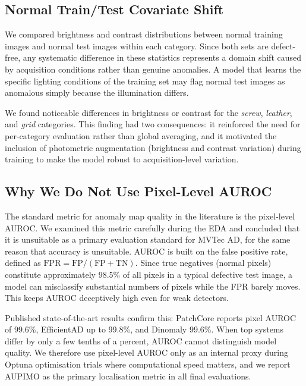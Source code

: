 \documentclass[11pt, a4paper]{article}
\begin{document}
\subsection{Normal Train/Test Covariate Shift}

We compared brightness and contrast distributions between normal training images and normal test images within each category. Since both sets are defect-free, any systematic difference in these statistics represents a domain shift caused by acquisition conditions rather than genuine anomalies. A model that learns the specific lighting conditions of the training set may flag normal test images as anomalous simply because the illumination differs.

We found noticeable differences in brightness or contrast for the \textit{screw}, \textit{leather}, and \textit{grid} categories. This finding had two consequences: it reinforced the need for per-category evaluation rather than global averaging, and it motivated the inclusion of photometric augmentation (brightness and contrast variation) during training to make the model robust to acquisition-level variation.

\subsection{Why We Do Not Use Pixel-Level AUROC}
\label{sec:auroc_critique}

The standard metric for anomaly map quality in the literature is the pixel-level AUROC. We examined this metric carefully during the EDA and concluded that it is unsuitable as a primary evaluation standard for MVTec AD, for the same reason that accuracy is unsuitable. AUROC is built on the false positive rate, defined as $\mathrm{FPR} = \mathrm{FP} / (\mathrm{FP} + \mathrm{TN})$. Since true negatives (normal pixels) constitute approximately 98.5\% of all pixels in a typical defective test image, a model can misclassify substantial numbers of pixels while the FPR barely moves. This keeps AUROC deceptively high even for weak detectors.

Published state-of-the-art results confirm this: PatchCore reports pixel AUROC of 99.6\%, EfficientAD up to 99.8\%, and Dinomaly 99.6\%. When top systems differ by only a few tenths of a percent, AUROC cannot distinguish model quality. We therefore use pixel-level AUROC only as an internal proxy during Optuna optimisation trials where computational speed matters, and we report AUPIMO as the primary localisation metric in all final evaluations.
\end{document}
